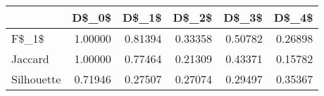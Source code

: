 \begin{table}
\centering
\caption{}
\label{}
\begin{tabular}{lrrrrr}
\toprule
{} &   D\$\_0\$ &   D\$\_1\$ &   D\$\_2\$ &   D\$\_3\$ &   D\$\_4\$ \\
\midrule
F\$\_1\$      & 1.00000 & 0.81394 & 0.33358 & 0.50782 & 0.26898 \\
Jaccard    & 1.00000 & 0.77464 & 0.21309 & 0.43371 & 0.15782 \\
Silhouette & 0.71946 & 0.27507 & 0.27074 & 0.29497 & 0.35367 \\
\bottomrule
\end{tabular}
\end{table}
